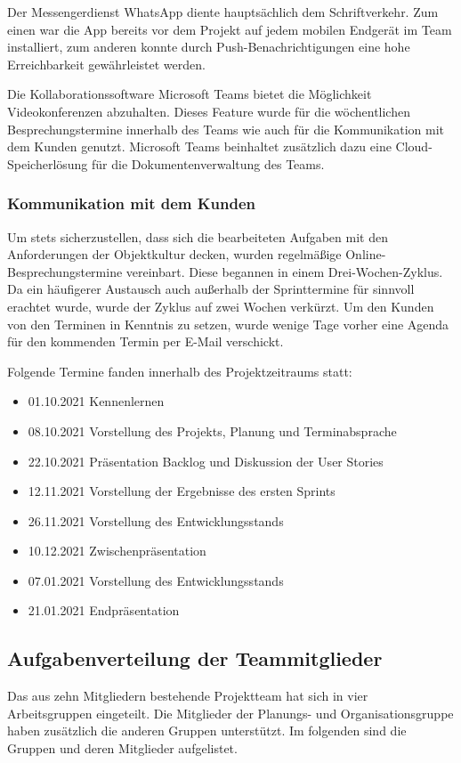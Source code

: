 Der Messengerdienst WhatsApp diente hauptsächlich dem Schriftverkehr. Zum einen war die App bereits vor dem Projekt auf jedem mobilen Endgerät im Team installiert, zum anderen konnte durch Push-Benachrichtigungen eine hohe Erreichbarkeit gewährleistet werden. 

Die Kollaborationssoftware Microsoft Teams bietet die Möglichkeit Videokonferenzen abzuhalten. Dieses Feature wurde für die wöchentlichen Besprechungstermine innerhalb des Teams wie auch für die Kommunikation mit dem Kunden genutzt. Microsoft Teams beinhaltet zusätzlich dazu eine Cloud-Speicherlösung für die Dokumentenverwaltung des Teams.

\subsubsection{Kommunikation mit dem Kunden}
Um stets sicherzustellen, dass sich die bearbeiteten Aufgaben mit den Anforderungen der Objektkultur decken, wurden regelmäßige Online-Besprechungstermine vereinbart. Diese begannen in einem Drei-Wochen-Zyklus. Da ein häufigerer Austausch auch außerhalb der Sprinttermine für sinnvoll erachtet wurde, wurde der Zyklus auf zwei Wochen verkürzt. Um den Kunden von den Terminen in Kenntnis zu setzen, wurde wenige Tage vorher eine Agenda für den kommenden Termin per E-Mail verschickt. 

Folgende Termine fanden innerhalb des Projektzeitraums statt:

\begin{itemize}
\item 01.10.2021 Kennenlernen
\item 08.10.2021 Vorstellung des Projekts, Planung und Terminabsprache
\item 22.10.2021 Präsentation Backlog und Diskussion der User Stories
\item 12.11.2021 Vorstellung der Ergebnisse des ersten Sprints
\item 26.11.2021 Vorstellung des Entwicklungsstands
\item 10.12.2021 Zwischenpräsentation
\item 07.01.2021 Vorstellung des Entwicklungsstands
\item 21.01.2021 Endpräsentation
\end{itemize}


\subsection{Aufgabenverteilung der Teammitglieder}
Das aus zehn Mitgliedern bestehende Projektteam hat sich in vier Arbeitsgruppen eingeteilt. Die Mitglieder der Planungs- und Organisationsgruppe haben zusätzlich die anderen Gruppen unterstützt.
Im folgenden sind die Gruppen und deren Mitglieder aufgelistet.

